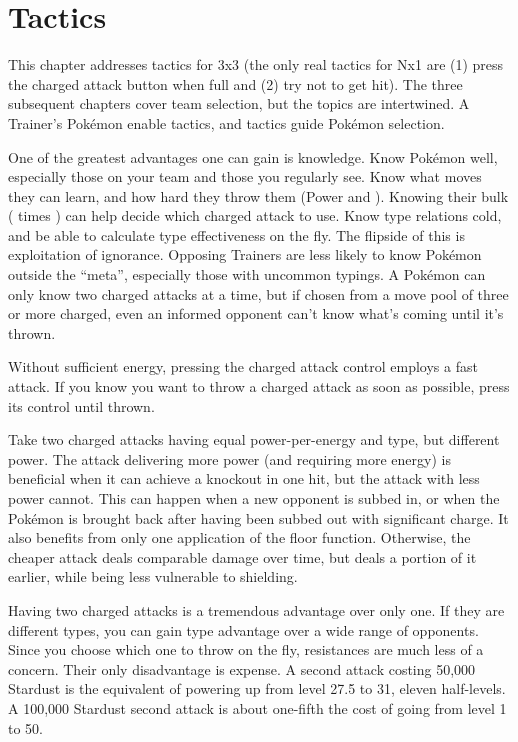 \chapter{Tactics\label{chap:strategy}}
This chapter addresses tactics for 3x3 (the only real tactics for Nx1 are (1)
  press the charged attack button when full and (2) try not to get hit).
The three subsequent chapters cover team selection, but the topics are intertwined.
A Trainer's Pokémon enable tactics, and tactics guide Pokémon selection.

One of the greatest advantages one can gain is knowledge.
Know Pokémon well, especially those on your team and those you regularly see.
Know what moves they can learn, and how hard they throw them (Power and ).
Knowing their bulk ( times \MHP) can help decide which charged attack to use.
Know type relations cold, and be able to calculate type effectiveness on the fly.
The flipside of this is exploitation of ignorance.
Opposing Trainers are less likely to know Pokémon outside the ``meta'',
 especially those with uncommon typings.
A Pokémon can only know two charged attacks at a time, but if
 chosen from a move pool of three or more charged, even an informed opponent
 can't know what's coming until it's thrown.

\begin{tipbox}[title=A tip regarding battle UI]
Without sufficient energy, pressing the charged attack control employs a fast attack.
If you know you want to throw a charged attack as soon as possible, press its control until thrown.
\end{tipbox}

Take two charged attacks having equal power-per-energy and type, but different power.
The attack delivering more power (and requiring more energy) is beneficial
 when it can achieve a knockout in one hit, but the attack with less power cannot.
This can happen when a new opponent is subbed in, or when the Pokémon is brought back
 after having been subbed out with significant charge.
It also benefits from only one application of the floor function.
Otherwise, the cheaper attack deals comparable damage over time, but deals a portion
 of it earlier, while being less vulnerable to shielding.

Having two charged attacks is a tremendous advantage over only one.
If they are different types, you can gain type advantage over a wide range of opponents.
Since you choose which one to throw on the fly, resistances are much less of a concern.
Their only disadvantage is expense.
A second attack costing 50,000 Stardust is the equivalent of powering up from level 27.5 to 31,
 eleven half-levels.
A 100,000 Stardust second attack is about one-fifth the cost of going from level 1 to 50.

